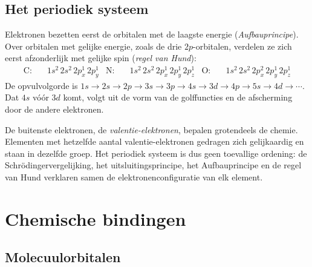 \subsection{Het periodiek systeem}

Elektronen bezetten eerst de orbitalen met de laagste energie (\emph{Aufbauprincipe}). Over orbitalen met gelijke energie, zoals de drie $2p$-orbitalen, verdelen ze zich eerst afzonderlijk met gelijke spin (\emph{regel van Hund}):
\begin{align*}
\text{C:}  &\quad 1s^2\,2s^2\,2p^1_x\, 2p^1_y &
\text{N:}  &\quad 1s^2\,2s^2\,2p^1_x\,2p^1_y\,2p^1_z &
\text{O:}  &\quad 1s^2\,2s^2\,2p^2_x\,2p^1_y\,2p^1_z
\end{align*}
De opvulvolgorde is $1s \to 2s \to 2p \to 3s \to 3p \to 4s \to 3d \to 4p \to 5s \to 4d \to \cdots$. Dat $4s$ vóór $3d$ komt, volgt uit de vorm van de golffuncties en de afscherming door de andere elektronen.

De buitenste elektronen, de \emph{valentie-elektronen}, bepalen grotendeels de chemie. Elementen met hetzelfde aantal valentie-elektronen gedragen zich gelijkaardig en staan in dezelfde groep. Het periodiek systeem is dus geen toevallige ordening: de Schr\"odingervergelijking, het uitsluitingsprincipe, het Aufbauprincipe en de regel van Hund verklaren samen de elektronenconfiguratie van elk element.

\section{Chemische bindingen}

\subsection{Molecuulorbitalen}
\label{sec:molecuulorbitalen}

